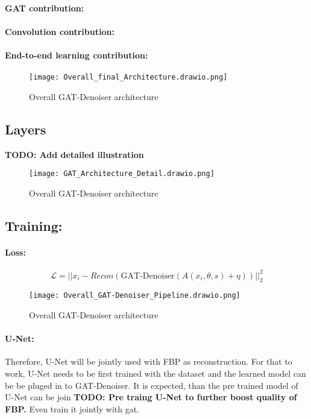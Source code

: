 \paragraph{GAT contribution:}

\paragraph{Convolution contribution:}

\paragraph{End-to-end learning contribution:}


\begin{figure}[h]
  \centering
  \label{fig:architecture-overall}
  \texttt{[image: Overall\_final\_Architecture.drawio.png]}
  \caption{Overall GAT-Denoiser architecture}
\end{figure}


\subsection{Layers}
\textbf{TODO: Add detailed illustration}

\begin{figure}[h]
  \centering
  \label{fig:architecture-detailed}
  \texttt{[image: GAT\_Architecture\_Detail.drawio.png]}
  \caption{Overall GAT-Denoiser architecture}
\end{figure}


\subsection{Training:}

\paragraph{Loss:}

\begin{equation}
  \mathcal{L} = || x_i - Recon ( \text{GAT-Denoiser}(A(x_i, \theta, s) + \eta)) ||^2_2
\end{equation}


\begin{figure}[h]
  \centering
  \label{fig:pipeline-overall}
  \texttt{[image: Overall\_GAT-Denoiser\_Pipeline.drawio.png]}
  \caption{Overall GAT-Denoiser architecture}
\end{figure}

\paragraph{U-Net:}
Therefore, U-Net will be jointly used with FBP as reconstruction. For that to work, U-Net needs to be 
first trained with the dataset and the learned model can be be pluged in to GAT-Denoiser.
It is expected, than the pre trained model of U-Net can be join
\textbf{TODO: Pre traing U-Net to further boost quality of FBP.}
Even train it jointly with gat.





